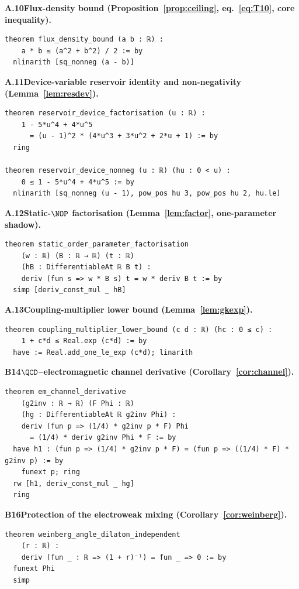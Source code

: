 \medskip \noindent\textbf{A.10\quad Flux-density bound (Proposition~\ref{prop:ceiling}, eq.~\eqref{eq:T10}, core inequality).}
\begin{verbatim}
theorem flux_density_bound (a b : ℝ) :
    a * b ≤ (a^2 + b^2) / 2 := by
  nlinarith [sq_nonneg (a - b)]
\end{verbatim}

\medskip \noindent\textbf{A.11\quad Device-variable reservoir identity and non-negativity (Lemma~\ref{lem:resdev}).}
\begin{verbatim}
theorem reservoir_device_factorisation (u : ℝ) :
    1 - 5*u^4 + 4*u^5
      = (u - 1)^2 * (4*u^3 + 3*u^2 + 2*u + 1) := by
  ring

theorem reservoir_device_nonneg (u : ℝ) (hu : 0 < u) :
    0 ≤ 1 - 5*u^4 + 4*u^5 := by
  nlinarith [sq_nonneg (u - 1), pow_pos hu 3, pow_pos hu 2, hu.le]
\end{verbatim}

\medskip \noindent\textbf{A.12\quad Static-$\NOP$ factorisation (Lemma~\ref{lem:factor}, one-parameter shadow).}
\begin{verbatim}
theorem static_order_parameter_factorisation
    (w : ℝ) (B : ℝ → ℝ) (t : ℝ)
    (hB : DifferentiableAt ℝ B t) :
    deriv (fun s => w * B s) t = w * deriv B t := by
  simp [deriv_const_mul _ hB]
\end{verbatim}

\medskip \noindent\textbf{A.13\quad Coupling-multiplier lower bound (Lemma~\ref{lem:gkexp}).}
\begin{verbatim}
theorem coupling_multiplier_lower_bound (c d : ℝ) (hc : 0 ≤ c) :
    1 + c*d ≤ Real.exp (c*d) := by
  have := Real.add_one_le_exp (c*d); linarith
\end{verbatim}

\medskip \noindent\textbf{B14\quad $\QCD$--electromagnetic channel derivative (Corollary~\ref{cor:channel}).}
\begin{verbatim}
theorem em_channel_derivative
    (g2inv : ℝ → ℝ) (F Phi : ℝ)
    (hg : DifferentiableAt ℝ g2inv Phi) :
    deriv (fun p => (1/4) * g2inv p * F) Phi
      = (1/4) * deriv g2inv Phi * F := by
  have h1 : (fun p => (1/4) * g2inv p * F) = (fun p => ((1/4) * F) * g2inv p) := by
    funext p; ring
  rw [h1, deriv_const_mul _ hg]
  ring
\end{verbatim}

\medskip \noindent\textbf{B16\quad Protection of the electroweak mixing (Corollary~\ref{cor:weinberg}).}
\begin{verbatim}
theorem weinberg_angle_dilaton_independent
    (r : ℝ) :
    deriv (fun _ : ℝ => (1 + r)⁻¹) = fun _ => 0 := by
  funext Phi
  simp
\end{verbatim}
